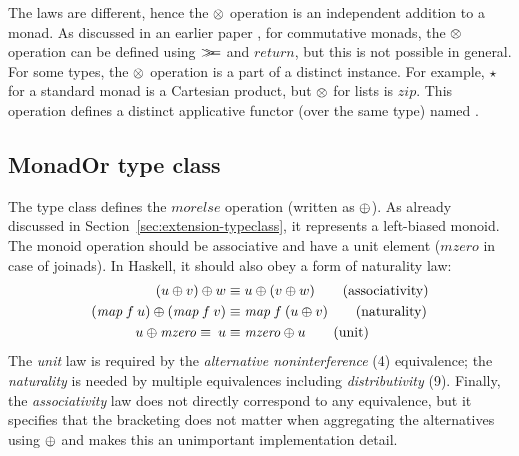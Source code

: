 \documentclass{sigplanconf}
\newcommand{\Varid}[1]{\mathit{#1}}
\newcommand{\bind}{\mathbin{>\!\!\!>\mkern-6.7mu=}}
\begin{document}
The laws are different, hence the $\otimes$ operation is an independent addition to a monad. As 
discussed in an earlier paper \cite{joinads}, for commutative monads, the $\otimes$ operation can be 
defined using \ensuremath{\bind } and \ensuremath{\Varid{return}}, but this is not possible in general. For some types, the $\otimes$ 
operation is a part of a distinct  instance. For example, $\star$ for a standard 
 monad is a Cartesian product, but $\otimes$ for lists is \ensuremath{\Varid{zip}}. This operation defines 
a distinct applicative functor (over the same type) named .


\subsection{MonadOr type class}
\label{sec:laws-monador}

The  type class defines the \ensuremath{\Varid{morelse}} operation (written as $\oplus$). As
already discussed in Section~\ref{sec:extension-typeclass}, it represents a left-biased monoid.
The monoid operation should be associative and have a unit element (\ensuremath{\Varid{mzero}} in case of joinads). 
In Haskell, it should also obey a form of naturality law:
\begin{align*}
  (u \morelse v) \morelse w &\equiv u \morelse (v \morelse w) \tag{associativity} \\
  (\map \: f \: u) \morelse (\map \: f \: v) &\equiv \map \: f \: (u \morelse v) \tag{naturality} \\
  u \morelse \mzero \equiv \: u &\equiv \mzero \morelse u \tag{unit}
\end{align*}
The \textit{unit} law is required by the \textit{alternative noninterference} (4) equivalence; 
the \textit{naturality} is needed by multiple equivalences including \textit{distributivity} (9).
Finally, the \textit{associativity} law does not directly correspond to any equivalence, but it 
specifies that the bracketing does not matter when aggregating the alternatives using $\oplus$
and makes this an unimportant implementation detail.
\end{document}
